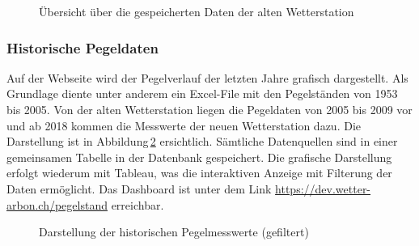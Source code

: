 \begin{figure}[h!]
	\centering
	\caption{Übersicht über die gespeicherten Daten der alten Wetterstation}
	\label{img:histAlt}
\end{figure}



\subsubsection{Historische Pegeldaten}
\label{subsec:pegelhistory}
Auf der Webseite wird der Pegelverlauf der letzten Jahre grafisch dargestellt. Als Grundlage diente unter anderem ein Excel-File mit den Pegelständen von 1953 bis 2005. Von der alten Wetterstation liegen die Pegeldaten von 2005 bis 2009 vor und ab 2018 kommen die Messwerte der neuen Wetterstation dazu. Die Darstellung ist in Abbildung\,\ref{img:histPegel} ersichtlich. Sämtliche Datenquellen sind in einer gemeinsamen Tabelle in der Datenbank gespeichert. Die grafische Darstellung erfolgt wiederum mit Tableau, was die interaktiven Anzeige mit Filterung der Daten ermöglicht. Das Dashboard ist unter dem Link \url{https://dev.wetter-arbon.ch/pegelstand} erreichbar.

\begin{figure}[h!]
	\centering
	\caption{Darstellung der historischen Pegelmesswerte (gefiltert)}
	\label{img:histPegel}
\end{figure}



